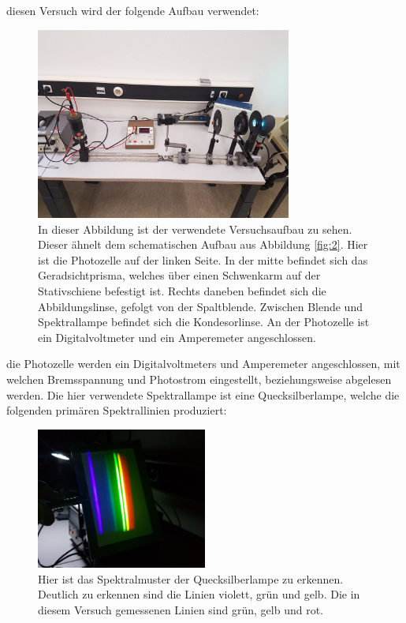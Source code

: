     \justifying diesen Versuch wird der folgende Aufbau verwendet:
    \begin{figure}[H]
        \centering
        \includegraphics[width=0.75\textwidth]{images/Aufbau.jpg}
        \caption{In dieser Abbildung ist der verwendete Versuchsaufbau zu sehen. Dieser ähnelt dem schematischen Aufbau aus Abbildung \ref{fig:2}. Hier ist die Photozelle
        auf der linken Seite. In der mitte befindet sich das Geradsichtprisma, welches über einen Schwenkarm auf der Stativschiene befestigt ist. Rechts daneben befindet 
        sich die Abbildungslinse, gefolgt von der Spaltblende. Zwischen Blende und Spektrallampe befindet sich die Kondesorlinse. An der Photozelle ist ein Digitalvoltmeter
        und ein Amperemeter angeschlossen.}
        \label{fig:5}
    \end{figure}
    \justifying die Photozelle werden ein Digitalvoltmeters und Amperemeter angeschlossen, mit welchen Bremsspannung und Photostrom eingestellt, beziehungsweise 
    abgelesen werden. Die hier verwendete Spektrallampe ist eine Quecksilberlampe, welche die folgenden primären Spektrallinien produziert:
    \begin{figure}[H]
        \centering
        \includegraphics[width=0.5\textwidth]{images/Spektral.jpg}
        \caption{Hier ist das Spektralmuster der Quecksilberlampe zu erkennen. Deutlich zu erkennen sind die Linien violett, grün und gelb. Die in diesem Versuch gemessenen 
        Linien sind grün, gelb und rot.}
        \label{fig:6}
    \end{figure}
